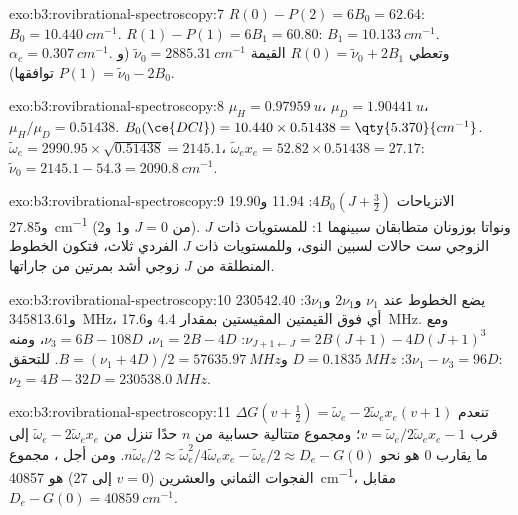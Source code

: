 \begin{solution}{exo:b3:rovibrational-spectroscopy:7}
$R(0) - P(2) = 6B_0 = 62.64$: $B_0 = \qty{10.440}{cm^{-1}}$. $R(1) - P(1) = 6B_1 = 60.80$:
$B_1 = \qty{10.133}{cm^{-1}}$. $\alpha_e = \qty{0.307}{cm^{-1}}$. وتعطي $R(0) = \tilde\nu_0 + 2B_1$
القيمة $\tilde\nu_0 = \qty{2885.31}{cm^{-1}}$ (و$P(1) = \tilde\nu_0 - 2B_0$ توافقها).
\end{solution}

\begin{solution}{exo:b3:rovibrational-spectroscopy:8}
$\mu_H = \qty{0.97959}{u}$، $\mu_D = \qty{1.90441}{u}$، $\mu_H/\mu_D = 0.51438$. $B_0(\ce{DCl})
= 10.440 \times 0.51438 = \qty{5.370}{cm^{-1}}$. $\tilde\omega_e = 2990.95 \times \sqrt{0.51438}
= 2145.1$، $\tilde\omega_ex_e = 52.82 \times 0.51438 = 27.17$: $\tilde\nu_0 = 2145.1 - 54.3 =
\qty{2090.8}{cm^{-1}}$.
\end{solution}

\begin{solution}{exo:b3:rovibrational-spectroscopy:9}
الانزياحات $4B_0(J + \frac32)$: 11.94 و19.90 و\qty{27.85}{cm^{-1}} (من $J = 0$ و1 و2). 
ونواتا  بوزونان متطابقان سبينهما 1: للمستويات ذات $J$ الزوجي ست
حالات لسبين النوى، وللمستويات ذات $J$ الفردي ثلاث، فتكون الخطوط المنطلقة من $J$ زوجي أشد
بمرتين من جاراتها.
\end{solution}

\begin{solution}{exo:b3:rovibrational-spectroscopy:10}
 يضع الخطوط عند $\nu_1$ و$2\nu_1$ و$3\nu_1$: $230542.40$ 
و\qty{345813.61}{MHz}، أي فوق القيمتين المقيستين بمقدار 4.4 و\qty{17.6}{MHz}. ومع
$\nu_{J+1\leftarrow J} = 2B(J+1) - 4D(J+1)^3$: $\nu_1 = 2B - 4D$، $\nu_3 = 6B - 108D$، ومنه
$3\nu_1 - \nu_3 = 96D$: $D = \qty{0.1835}{MHz}$ و$B = (\nu_1 + 4D)/2 =
\qty{57635.97}{MHz}$. للتحقق: $\nu_2 = 4B - 32D = \qty{230538.0}{MHz}$.
\end{solution}

\begin{solution}{exo:b3:rovibrational-spectroscopy:11}
تنعدم $\Delta G(v + \frac12) = \tilde\omega_e - 2\tilde\omega_ex_e(v+1)$ قرب $v =
\tilde\omega_e/2\tilde\omega_ex_e - 1$؛ ومجموع متتالية حسابية من $n$ حدًا
تنزل من $\tilde\omega_e - 2\tilde\omega_ex_e$ إلى ما يقارب 0 هو نحو $n\tilde\omega_e/2 \approx
\tilde\omega_e^2/4\tilde\omega_ex_e - \tilde\omega_e/2 \approx D_e - G(0)$. ومن أجل ، مجموع الفجوات الثماني والعشرين
($v = 0$ إلى 27) هو \qty{40857}{cm^{-1}}، مقابل $D_e - G(0) = \qty{40859}{cm^{-1}}$.
\end{solution}

